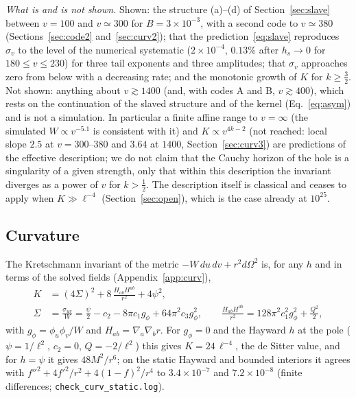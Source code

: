 \documentclass[11pt]{article}
\begin{document}
\emph{What is and is not shown.} Shown: the structure (a)--(d) of Section~\ref{sec:slave} between $v=100$ and $v\simeq300$ for $B=3\times10^{-3}$, with a second code to $v\simeq380$ (Sections~\ref{sec:code2} and~\ref{sec:curv2}); that the prediction~\eqref{eq:slave} reproduces $\sigma_v$ to the level of the numerical systematic ($2\times10^{-4}$, $0.13\%$ after $h_s\to0$ for $180\le v\le230$) for three tail exponents and three amplitudes; that $\sigma_v$ approaches zero from below with a decreasing rate; and the monotonic growth of $K$ for $k\ge\tfrac32$. Not shown: anything about $v\gtrsim1400$ (and, with codes A and B, $v\gtrsim400$), which rests on the continuation of the slaved structure and of the kernel (Eq.~\eqref{eq:asym}) and is not a simulation. In particular a finite affine range to $v=\infty$ (the simulated $W\propto v^{-5.1}$ is consistent with it) and $K\propto v^{4k-2}$ (not reached: local slope $2.5$ at $v=300$--$380$ and $3.64$ at $1400$, Section~\ref{sec:curv3}) are predictions of the effective description; we do not claim that the Cauchy horizon of the hole is a singularity of a given strength, only that within this description the invariant diverges as a power of $v$ for $k>\tfrac12$. The description itself is classical and ceases to apply when $K\gg\ell^{-4}$ (Section~\ref{sec:open}), which is the case already at $10^{25}$.

\subsection{Curvature}
\label{sec:curv}

The Kretschmann invariant of the metric $-W\,du\,dv+r^{2}d\Omega^{2}$ is, for any $h$ and in terms of the solved fields (Appendix~\ref{app:curv}),
\begin{align}
K&=(4\Sigma)^{2}+8\,\frac{H_{ab}H^{ab}}{r^{2}}+4\psi^{2},\label{eq:kret}\\
\Sigma&=\frac{\sigma_{uv}}{W}=\frac{\psi}{2}-c_2-8\pi c_1g_\phi+64\pi^{2}c_3g_\phi^{2},\qquad
\frac{H_{ab}H^{ab}}{r^{2}}=128\pi^{2}c_1^{2}g_\phi^{2}+\frac{Q^{2}}2,\nonumber
\end{align}
with $g_\phi=\phi_u\phi_v/W$ and $H_{ab}=\nabla_a\nabla_br$. For $g_\phi=0$ and the Hayward $h$ at the pole ($\psi=1/\ell^{2}$, $c_2=0$, $Q=-2/\ell^{2}$) this gives $K=24\,\ell^{-4}$, the de Sitter value, and for $h=\psi$ it gives $48M^{2}/r^{6}$; on the static Hayward and bounded interiors it agrees with $f''^{2}+4f'^{2}/r^{2}+4(1-f)^{2}/r^{4}$ to $3.4\times10^{-7}$ and $7.2\times10^{-8}$ (finite differences; \texttt{check\_curv\_static.log}).
\end{document}
